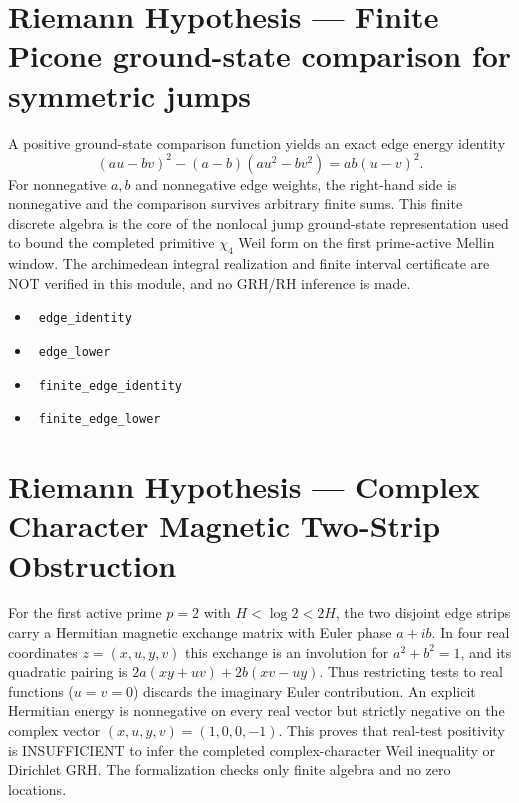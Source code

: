 \documentclass{report}
\theoremstyle{definition}
\begin{document}
\section{Riemann Hypothesis --- Finite Picone ground-state comparison for symmetric jumps}
A positive ground-state comparison function yields an exact
edge energy identity
\[
 (au-bv)^2-(a-b)(au^2-bv^2)=ab(u-v)^2.
\]
For nonnegative $a,b$ and nonnegative edge weights, the right-hand side
is nonnegative and the comparison survives arbitrary finite sums.
This finite discrete algebra is the core of the nonlocal jump
ground-state representation used to bound the completed primitive
$\chi_4$ Weil form on the first prime-active Mellin window.
The archimedean integral realization and finite interval certificate
are NOT verified in this module, and no GRH/RH inference is made.
\begin{itemize}
\item {}\leanok\ \texttt{edge\_identity}
\item {}\leanok\ \texttt{edge\_lower}
\item {}\leanok\ \texttt{finite\_edge\_identity}
\item {}\leanok\ \texttt{finite\_edge\_lower}
\end{itemize}

\section{Riemann Hypothesis --- Complex Character Magnetic Two-Strip Obstruction}
For the first active prime $p=2$ with $H<\log 2<2H$, the two
disjoint edge strips carry a Hermitian magnetic exchange matrix
with Euler phase $a+ib$. In four real coordinates
$z=(x,u,y,v)$ this exchange is an involution for $a^2+b^2=1$,
and its quadratic pairing is
$2a(xy+uv)+2b(xv-uy)$.
Thus restricting tests to real functions ($u=v=0$) discards the
imaginary Euler contribution. An explicit Hermitian energy is
nonnegative on every real vector but strictly negative on the
complex vector $(x,u,y,v)=(1,0,0,-1)$.
This proves that real-test positivity is INSUFFICIENT to infer
the completed complex-character Weil inequality or Dirichlet GRH.
The formalization checks only finite algebra and no zero locations.
\end{document}
